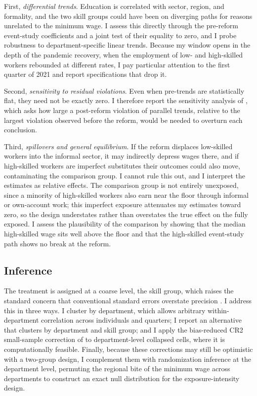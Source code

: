 First, \emph{differential trends}. Education is correlated with sector, region, and formality,
and the two skill groups could have been on diverging paths for reasons unrelated to the
minimum wage. I assess this directly through the pre-reform event-study coefficients and a
joint test of their equality to zero, and I probe robustness to department-specific linear
trends. Because my window opens in the depth of the pandemic recovery, when the employment of
low- and high-skilled workers rebounded at different rates, I pay particular attention to the
first quarter of 2021 and report specifications that drop it.

Second, \emph{sensitivity to residual violations}. Even when pre-trends are statistically flat,
they need not be exactly zero. I therefore report the sensitivity analysis of
\citet{rambachan_roth_2023}, which asks how large a post-reform violation of parallel trends,
relative to the largest violation observed before the reform, would be needed to overturn each
conclusion.

Third, \emph{spillovers and general equilibrium}. If the reform displaces low-skilled workers
into the informal sector, it may indirectly depress wages there, and if high-skilled workers are
imperfect substitutes their outcomes could also move, contaminating the comparison group. I
cannot rule this out, and I interpret the estimates as relative effects. The comparison group is not
entirely unexposed, since a minority of high-skilled workers also earn near the floor through
informal or own-account work; this imperfect exposure attenuates my estimates toward zero, so
the design understates rather than overstates the true effect on the fully exposed. I assess the
plausibility of the comparison by showing that the median high-skilled wage sits well above the
floor and that the high-skilled event-study path shows no break at the reform.

\subsection{Inference}

The treatment is assigned at a coarse level, the skill group, which raises the standard concern
that conventional standard errors overstate precision \citep{bertrand_2004}. I address this in
three ways. I cluster by department, which allows arbitrary within-department correlation across
individuals and quarters; I report an alternative that clusters by department and skill group; and
I apply the bias-reduced CR2 small-sample correction of \citet{pustejovsky_tipton_2018} to
department-level collapsed cells, where it is computationally feasible. Finally, because these
corrections may still be optimistic with a two-group design, I complement them with randomization
inference at the department level, permuting the regional bite of the minimum wage across departments
to construct an exact null distribution for the exposure-intensity design.
